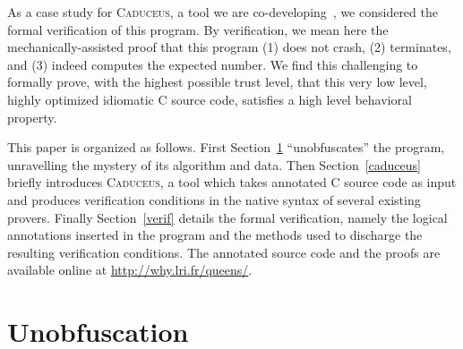 \documentclass[a4paper]{llncs}
\newcommand{\caduceus}{\textsc{Caduceus}}
\begin{document}
As a case study for \caduceus, a tool we are
co-developing~\cite{caduceus}, we considered 
the formal verification of this program. By verification, we mean here
the mechanically-assisted proof that this program (1) does not crash, 
(2) terminates, and (3) indeed computes the expected number. 
We find this challenging to formally prove, with the highest
possible trust level, that this very low level, highly optimized
idiomatic C source code, satisfies a high level behavioral property.

This paper is organized as follows. First Section~\ref{unobf}
``unobfuscates'' the program, unravelling the mystery of its algorithm
and data. Then Section~\ref{caduceus} briefly introduces \caduceus, a
tool which takes annotated C source code as input and produces
verification conditions in the native syntax of several existing provers.
Finally Section~\ref{verif} details the formal verification, namely
the logical annotations inserted in the program and the methods used
to discharge the resulting verification conditions.  The annotated
source code and the proofs are available online at
\url{http://why.lri.fr/queens/}.


\section{Unobfuscation}\label{unobf}
\end{document}
